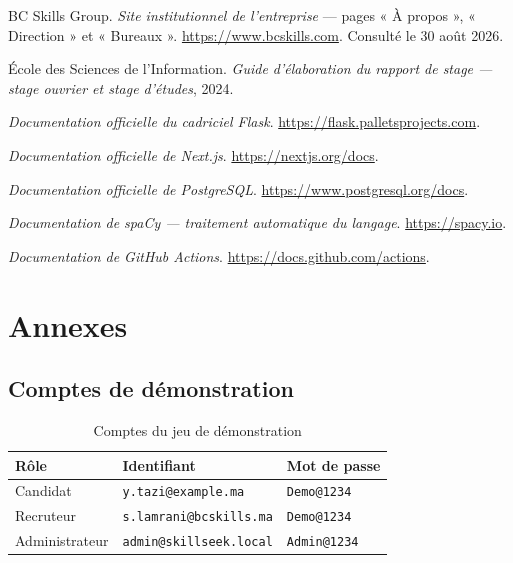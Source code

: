 \documentclass[12pt,a4paper]{report}
\begin{document}
\begin{enumerate}[label={[\arabic*]}]
  \item BC Skills Group. \emph{Site institutionnel de l'entreprise} ---
        pages « À propos », « Direction » et « Bureaux ».
        \url{https://www.bcskills.com}. Consulté le 30 août 2026.
  \item École des Sciences de l'Information. \emph{Guide d'élaboration du
        rapport de stage --- stage ouvrier et stage d'études}, 2024.
  \item \emph{Documentation officielle du cadriciel Flask}.
        \url{https://flask.palletsprojects.com}.
  \item \emph{Documentation officielle de Next.js}.
        \url{https://nextjs.org/docs}.
  \item \emph{Documentation officielle de PostgreSQL}.
        \url{https://www.postgresql.org/docs}.
  \item \emph{Documentation de spaCy --- traitement automatique du langage}.
        \url{https://spacy.io}.
  \item \emph{Documentation de GitHub Actions}.
        \url{https://docs.github.com/actions}.
\end{enumerate}

\appendix
\chapter{Annexes}

\section{Comptes de démonstration}

\begin{table}[H]
\centering
\caption{Comptes du jeu de démonstration}
\label{tab:comptes}
\begin{tabular}{@{}lll@{}}
\toprule
\textbf{Rôle} & \textbf{Identifiant} & \textbf{Mot de passe} \\
\midrule
Candidat & \texttt{y.tazi@example.ma} & \texttt{Demo@1234} \\
Recruteur & \texttt{s.lamrani@bcskills.ma} & \texttt{Demo@1234} \\
Administrateur & \texttt{admin@skillseek.local} & \texttt{Admin@1234} \\
\bottomrule
\end{tabular}
\end{table}
\end{document}
